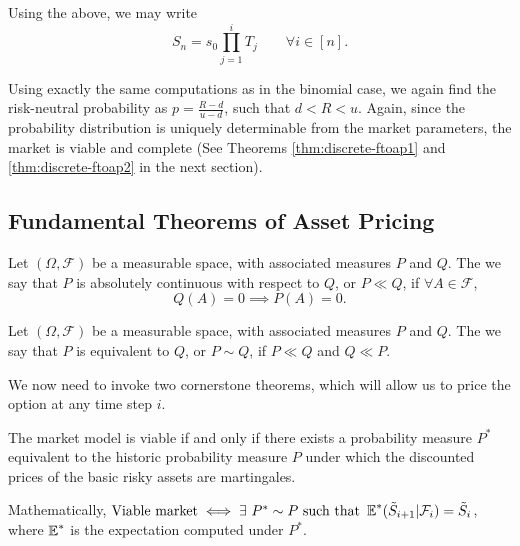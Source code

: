 Using the above, we may write
\begin{equation}
	\label{eq:discrete-risky-prod-iid}
	S_n = s_0 \prod_{j=1}^{i} T_j  \qquad  \forall i \in [n] .
\end{equation}


Using exactly the same computations as in the binomial case, we again find the risk-neutral probability as $ p = \frac{R - d}{u - d} $, such that $ d < R < u $. Again, since the probability distribution is uniquely determinable from the market parameters, the market is viable and complete (See Theorems \ref{thm:discrete-ftoap1} and \ref{thm:discrete-ftoap2} in the next section).



\subsection{Fundamental Theorems of Asset Pricing}


\begin{dfn}
	Let $ (\Omega, \mathcal{F}) $ be a measurable space, with associated measures $ P $ and $ Q $. The we say that $ P $ is absolutely continuous with respect to $ Q $, or $ P \ll Q $, if $ \forall A \in \mathcal{F} $,
	\begin{equation*}
		Q(A) = 0 \implies P(A) = 0 .
	\end{equation*}
\end{dfn}

\begin{dfn}
	Let $ (\Omega, \mathcal{F}) $ be a measurable space, with associated measures $ P $ and $ Q $. The we say that $ P $ is equivalent to $ Q $, or $ P \sim Q $, if $ P \ll Q $ and $ Q \ll P $.
\end{dfn}


We now need to invoke two cornerstone theorems, which will allow us to price the option at any time step $ i $.

\begin{thm}
	\label{thm:discrete-ftoap1}
	The market model is viable if and only if there exists a probability measure $ P^* $ equivalent to the historic probability measure $ P $ under which the discounted prices of the basic risky assets are martingales.
	
	Mathematically,
	$ \text{Viable market} \iff \exists \  P^* \sim P \text{ such that } \operatorname{\mathbb{E}}^*( \tilde{S}_{i+1} | \mathcal{F}_i ) = \tilde{S}_{i} $, where $ \operatorname{\mathbb{E}}^* $ is the expectation computed under $ P^* $.
\end{thm}

